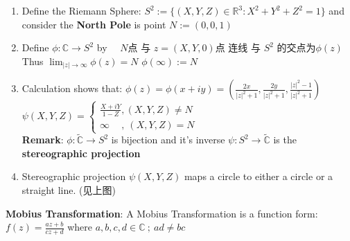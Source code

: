 \documentclass[9pt]{article}
\begin{document}
\begin{enumerate}[itemsep=-2pt, topsep=-2pt]
    \item Define the Riemann Sphere: $S^2:=\{(X,Y,Z)\in\mathbb{R}^3:X^2+Y^2+Z^2=1\}$ and consider the \textbf{North Pole} is point $N:=(0,0,1)$
    \item Define $\phi:\mathbb{C}\to S^2$ by \ \ $N$点 与 $z=(X,Y,0)$点 连线 与 $S^2$ 的交点为$\phi(z)$ \quad \quad Thus $\lim_{|z|\to\infty}\phi(z)=N$ \quad $\phi(\infty):=N$
    \item Calculation shows that: $\phi(z)=\phi(x+iy)=\left(\frac{2x}{|z|^2+1},\frac{2y}{|z|^2+1},\frac{|z|^2-1}{|z|^2+1}\right)$ \qquad \qquad $\psi(X,Y,Z)=\begin{cases}\frac{X+iY}{1-Z} , (X,Y,Z)\ne N \\ \infty \quad \ , \ (X,Y,Z)=N\end{cases}$ \\
    \textbf{Remark}: $\phi:\widetilde{\mathbb{C}}\to S^2$ is bijection and it's inverse $\psi:S^2\to\widetilde{\mathbb{C}}$ is the \textbf{stereographic projection}
    \item Stereographic projection $\psi(X,Y,Z)$ maps a circle to either a circle or a straight line. (见上图)
\end{enumerate}

\textbf{Mobius Transformation}: A Mobius Transformation is a function form: $f(z)=\frac{az+b}{cz+d}$ where $a,b,c,d\in\mathbb{C} \ ; \ ad\ne bc$
\end{document}
